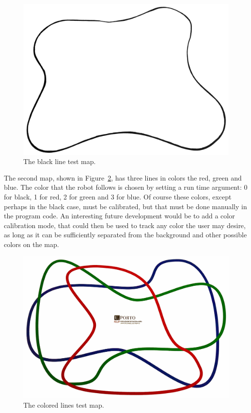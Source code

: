 \documentclass[10pt,conference,compsoc]{IEEEtran}
\begin{document}
\begin{figure}[thpb]
\centering
\includegraphics[scale=0.06]{img/map_black.png}
\caption{The black line test map.}
\label{fig:map_black}
\end{figure}

The second map, shown in Figure~\ref{fig:map_color}, has three lines in colors the red, green and blue. The color that the robot follows is chosen by setting a run time argument: 0 for black, 1 for red, 2 for green and 3 for blue. Of course these colors, except perhaps in the black case, must be calibrated, but that must be done manually in the program code. An interesting future development would be to add a color calibration mode, that could then be used to track any color the user may desire, as long as it can be sufficiently separated from the background and other possible colors on the map.

\begin{figure}[thpb]
\centering
\includegraphics[scale=0.06]{img/map_color_final.jpg}
\caption{The colored lines test map.}
\label{fig:map_color}
\end{figure}
\end{document}
